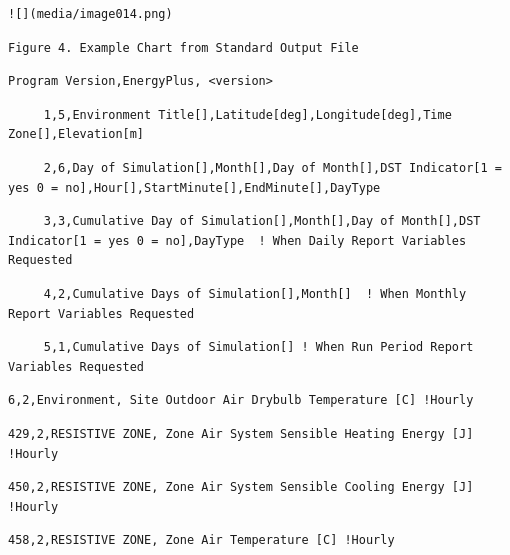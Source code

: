 \begin{lstlisting}
![](media/image014.png)
\end{lstlisting}

\begin{lstlisting}
Figure 4. Example Chart from Standard Output File
\end{lstlisting}

\begin{lstlisting}
Program Version,EnergyPlus, <version>
\end{lstlisting}

\begin{lstlisting}
     1,5,Environment Title[],Latitude[deg],Longitude[deg],Time Zone[],Elevation[m]
\end{lstlisting}

\begin{lstlisting}
     2,6,Day of Simulation[],Month[],Day of Month[],DST Indicator[1 = yes 0 = no],Hour[],StartMinute[],EndMinute[],DayType
\end{lstlisting}

\begin{lstlisting}
     3,3,Cumulative Day of Simulation[],Month[],Day of Month[],DST Indicator[1 = yes 0 = no],DayType  ! When Daily Report Variables Requested
\end{lstlisting}

\begin{lstlisting}
     4,2,Cumulative Days of Simulation[],Month[]  ! When Monthly Report Variables Requested
\end{lstlisting}

\begin{lstlisting}
     5,1,Cumulative Days of Simulation[] ! When Run Period Report Variables Requested
\end{lstlisting}

\begin{lstlisting}
6,2,Environment, Site Outdoor Air Drybulb Temperature [C] !Hourly
\end{lstlisting}

\begin{lstlisting}
429,2,RESISTIVE ZONE, Zone Air System Sensible Heating Energy [J] !Hourly
\end{lstlisting}

\begin{lstlisting}
450,2,RESISTIVE ZONE, Zone Air System Sensible Cooling Energy [J] !Hourly
\end{lstlisting}

\begin{lstlisting}
458,2,RESISTIVE ZONE, Zone Air Temperature [C] !Hourly
\end{lstlisting}

